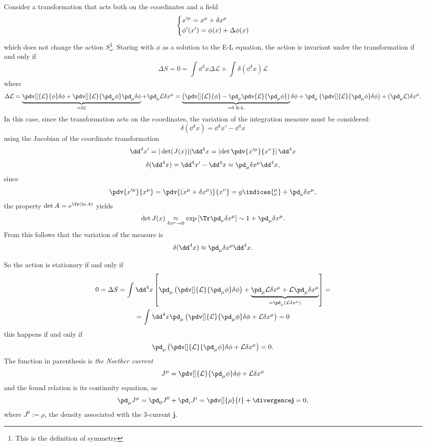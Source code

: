Consider a transformation that acts both on the coordinates and a field
$$\begin{dcases*}
  x'^\mu = x^\mu + \delta x^\mu\\
  \phi'(x')=\phi(x)+\Delta\phi(x)
  \end{dcases*}$$
which does not change the action $S$\footnote{This is the definition of symmetry}.
Staring with $\phi$ as a solution to the E-L equation, the action is invariant under
the transformation if and only if
$$\Delta S =0=\int_{}^{}\dd^4x\Delta\mathcal{L}+\int_{}^{}\delta(\dd^4x)\mathcal{L}$$
where
$$\Delta\mathcal{L} = \underbrace{\pdv[]{\mathcal{L}}{\phi}\delta\phi+
\pdv[]{\mathcal{L}}{\pd_\mu\phi}\pd_\mu\delta\phi}_{
= \delta\mathcal{L}} + \pd_\mu\mathcal{L}\delta x^\mu= \underbrace{\left(\pdv[]{
\mathcal{L}}{\phi} - \pd_\mu\pdv{\mathcal{L}}{\pd_\mu\phi}\right)}_{=0\text{ E-L}}
\delta\phi+\pd_\mu\left(\pdv[]{\mathcal{L}}{\pd_\mu\phi}\delta\phi\right)+
(\pd_\mu\mathcal{L})\delta x^\mu.$$
In this case, since the transformation acts on the coordinates, the variation of
the integration measure must be considered:
$$\delta(\dd^4x)= \dd^4x'-\dd^4x$$
using the Jacobian of the coordinate transformation
$$\dd^4x' = |\det(J(x))|\dd^4x = \left|\det\pdv{x'^\mu}{x^\nu}\right|\dd^4x$$
$$
\delta(\dd^4x)=\dd^4x'-\dd^4x\approx \pd_\mu\delta x^\mu\dd^4x,
$$
since
$$\pdv{x'^\mu}{x^\mu} = \pdv{(x^\mu+\delta x^\mu)}{x^\nu} = g\indices{^\mu_\nu}+
\pd_\nu\delta x^\mu,$$
the property $\det A=e^{\Tr(\ln A)}$ yields
$$\det J(x) \underset{\delta x^\mu\to0}\approx\exp\left[\Tr\pd_\nu\delta x^\mu\right]
\sim 1+\pd_\mu\delta x^\mu.$$
From this follows that the variation of the measure is
$$\delta(\dd^4x) \approx \pd_\mu\delta x^\mu\dd^4x.$$

So the action is stationary if and only if
\begin{gather*}
0 = \Delta S = \int_{}^{}\dd^4x \left[\pd_\mu\left(\pdv[]{\mathcal{L}}{\pd_\mu\phi}
\delta\phi\right)+\underbrace{\pd_\mu\mathcal{L}\delta x^\mu + \mathcal{L}\pd_\mu
\delta x^\mu}_{=\pd_\mu(\mathcal{L}\delta x^\mu)}\right] = \\
= \int_{}^{}\dd^4x \pd_\mu\left(\pdv[]{\mathcal{L}}{\pd_\mu\phi}\delta\phi+
\mathcal{L}\delta x^\mu\right) = 0
\end{gather*}
this happens if and only if
$$\pd_\mu\left(\pdv[]{\mathcal{L}}{\pd_\mu\phi}\delta\phi+
\mathcal{L}\delta x^\mu\right)= 0. $$
The function in parenthesis is \textit{the Noether current}
$$J^\mu =\pdv[]{\mathcal{L}}{\pd_\mu\phi}\delta\phi+\mathcal{L}\delta x^\mu $$
and the found relation is its continuity equation, as
$$\pd_\mu J^\mu = \pd_0 J^0 + \pd_i J^i = \pdv[]{\rho}{t}+\divergence\mathbf{j}=0,$$
where $J^0:=\rho$, the density associated with the 3-current
$\mathbf{j}$.

